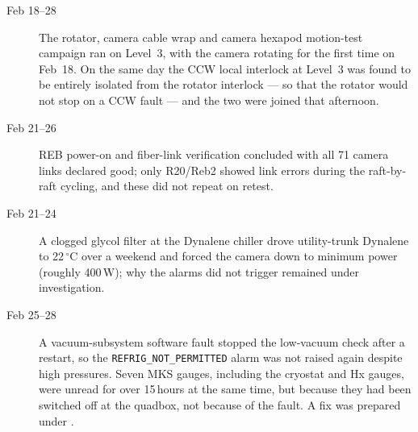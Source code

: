 \begin{description}
\item[Feb 18--28] The rotator, camera cable wrap and camera hexapod
  motion-test campaign ran on Level~3, with the camera rotating for
  the first time on Feb~18.  On the same day the CCW local interlock
  at Level~3 was found to be entirely isolated from the rotator
  interlock --- so that the rotator would not stop on a CCW fault ---
  and the two were joined that afternoon.

\item[Feb 21--26] REB power-on and fiber-link verification concluded
  with all 71 camera links declared good; only R20/Reb2 showed link
  errors during the raft-by-raft cycling, and these did not repeat on
  retest.

\item[Feb 21--24] A clogged glycol filter at the Dynalene chiller
  drove utility-trunk Dynalene to 22\,$^{\circ}$C over a weekend and
  forced the camera down to minimum power (roughly 400\,W); why the
  alarms did not trigger remained under investigation.

\item[Feb 25--28] A vacuum-subsystem software fault stopped the
  low-vacuum check after a restart, so the \texttt{REFRIG\_NOT\_PERMITTED}
  alarm was not raised again despite high pressures.  Seven MKS gauges,
  including the cryostat and Hx gauges, were unread for over 15\,hours at
  the same time, but because they had been switched off at the quadbox,
  not because of the fault.  A fix was prepared under
  .
\end{description}

